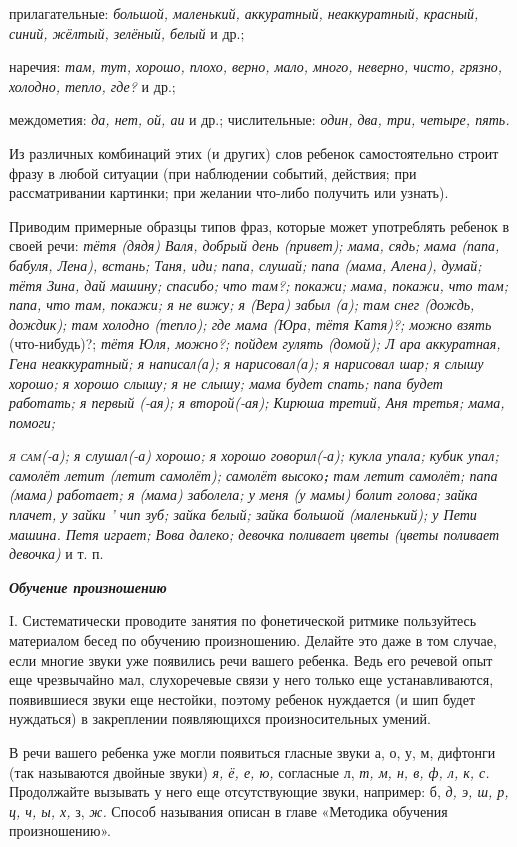 \documentclass[a5paper]{book}
\renewcommand{\emph}[1]{\textit{#1}}
\begin{document}
прилагательные: \emph{большой, маленький, аккуратный, неаккуратный,
красный, синий, жёлтый, зелёный, белый} и др.;

наречия: \emph{там, тут, хорошо, плохо, верно, мало, много, неверно,
чисто, грязно, холодно, тепло, где?} и др.;

междометия: \emph{да, нет, ой, аи} и др.; числительные: \emph{один, два,
три, четыре, пять.}

Из различных комбинаций этих (и других) слов ребенок самостоятельно
строит фразу в любой ситуации (при наблюдении событий, действия; при
рассматривании картинки; при желании что-либо получить или узнать).

Приводим примерные образцы типов фраз, которые может употреблять ребенок
в своей речи: \emph{тётя (дядя) Валя, добрый день (привет); мама, сядь;
мама (папа, бабуля, Лена), встань; Таня, иди; папа, слушай; папа (мама,
Алена), думай; тётя Зина, дай машину; спасибо; что там?; покажи; мама,
покажи, что там; папа, что там, покажи; я не вижу; я (Вера) забыл (а);
там снег (дождь, дождик); там холодно (тепло); где мама (Юра, тётя
Катя)?; можно взять} (что-нибудь)?; \emph{тётя Юля, можно?; пойдем
гулять (домой); Л ара аккуратная, Гена неаккуратный; я написал(а); я
нарисовал(а); я нарисовал шар; я слышу хорошо; я хорошо слышу; я не
слышу; мама будет спать; папа будет работать; я первый (-ая); я
второй(-ая); Кирюша третий, Аня третья; мама, помоги;}

\emph{\textsc{я сам}(-а); я слушал(-а) хорошо; я хорошо говорил(-а);
кукла упала; кубик упал; самолёт летит (летит самолёт); самолёт
высоко\textbf{;} там летит самолёт; папа (мама) работает; я (мама)
заболела; у меня (у мамы) болит голова; зайка плачет, у зайки ' чип зуб;
зайка белый; зайка большой (маленький); у Пети машина. Петя играет; Вова
далеко; девочка поливает цветы (цветы поливает девочка)} и т. п.

\emph{\textbf{Обучение произношению}}

I. Систематически проводите занятия по фонетической ритмике пользуйтесь
материалом бесед по обучению произношению. Делайте это даже в том
случае, если многие звуки уже появились речи вашего ребенка. Ведь его
речевой опыт еще чрезвычайно мал, слухоречевые связи у него только еще
устанавливаются, появившиеся звуки еще нестойки, поэтому ребенок
нуждается (и шип будет нуждаться) в закреплении появляющихся
произносительных умений.

В речи вашего ребенка уже могли появиться гласные звуки а, о, у, м,
дифтонги (так называются двойные звуки) \emph{я, ё, е, ю,} согласные л,
\emph{т, м, н, в, ф, л, к, с.} Продолжайте вызывать у него еще
отсутствующие звуки, например: б, \emph{д, э, ш, р, ц, ч, ы, х,} з,
\emph{ж.} Способ называния описан в главе «Методика обучения
произношению».
\end{document}
